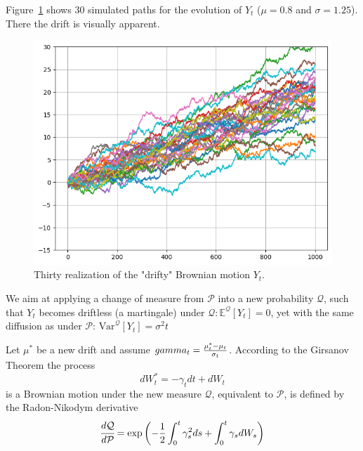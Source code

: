\documentclass[12pt,a4paper]{article}
\begin{document}
Figure~\ref{fig:brownian_motion_drift} shows 30 simulated paths for the evolution of $Y_t$ ($\mu = 0.8$ and $\sigma =1.25$). There the drift is visually apparent.
\begin{figure}[htbp]
\begin{center}
	\includegraphics[width=0.5\linewidth]{addons/brownian_motion_drift}
\end{center}
\label{fig:brownian_motion_drift}
	\caption{Thirty realization of the "drifty" Brownian motion $Y_t$.}
\end{figure}

We aim at applying a change of measure from $\mathcal{P}$ into a new probability $\mathcal{Q}$, such that $Y_t$ becomes driftless (a martingale) under $\mathcal{Q}: \mathbb{E}^{\mathcal{Q}}[Y_t]=0$, yet with the same diffusion as under $\mathcal{P}$: $\text{Var}^{\mathcal{Q}}[Y_t]=\sigma^2 t$

Let $\mu^{*}$ be a new drift and assume $\\gamma_t = \frac{\mu_t^{*}-\mu_t}{\sigma_t}$. According to the Girsanov Theorem the process
\begin{equation}
dW^{*}_t = -\gamma_t dt + dW_t
\end{equation}
is a Brownian motion under the new measure $\mathcal{Q}$, equivalent to $\mathcal{P}$, is defined by the Radon-Nikodym derivative
\begin{equation}
\cfrac{d\mathcal{Q}}{d\mathcal{P}} = \exp\left(-\frac{1}{2}\int_0^t\gamma_s^2 ds + \int_0^t\gamma_s dW_s\right)
\end{equation}
\end{document}
